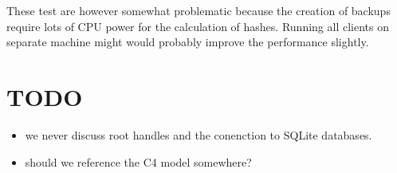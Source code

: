 These test are however somewhat problematic because the creation of backups require lots of CPU power for the calculation of hashes. Running all clients on separate machine might would probably improve the performance slightly.



\section{TODO}

\begin{itemize}
	\item we never discuss root handles and the conenction to SQLite databases.
	\item should we reference the C4 model somewhere?
\end{itemize}